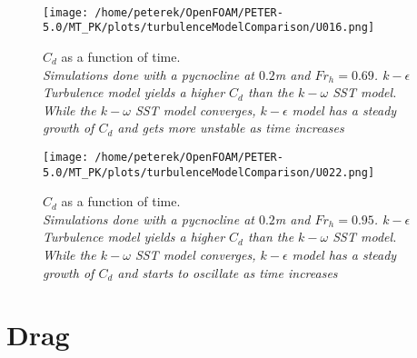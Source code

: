 \documentclass[a4paper, 12pt]{report}
\begin{document}
\\
\begin{minipage}[t]{.45\textwidth}
	\begin{figure}[H]
		\centering
		\texttt{[image: /home/peterek/OpenFOAM/PETER-5.0/MT\_PK/plots/turbulenceModelComparison/U016.png]}
		\caption{$C_d$ as a function of time.\\ \textit{Simulations done with a pycnocline at $0.2$m and $Fr_h=0.69$. $k-\epsilon$ Turbulence model yields a higher $C_d$ than the $k-\omega$ SST model. While the $k-\omega$ SST model converges, $k-\epsilon$ model has a steady growth of $C_d$ and gets more unstable as time increases}}
		\label{fig:turbulenceModelComparison1}
	\end{figure}
\end{minipage}\hfill
\vspace{2ex}
\begin{minipage}[t]{.45\textwidth} 
	\begin{figure}[H]
		\centering
		\texttt{[image: /home/peterek/OpenFOAM/PETER-5.0/MT\_PK/plots/turbulenceModelComparison/U022.png]}
		\caption{$C_d$ as a function of time.  \\ \textit{Simulations done with a pycnocline at $0.2$m and $Fr_h=0.95$. $k-\epsilon$ Turbulence model yields a higher $C_d$ than the $k-\omega$ SST model. While the $k-\omega$ SST model converges, $k-\epsilon$ model has a steady growth of $C_d$ and starts to oscillate as time increases}}
		\label{fig:turbulenceModelComparison2}
	\end{figure}
\end{minipage}\hfill

\section{Drag}
\end{document}
